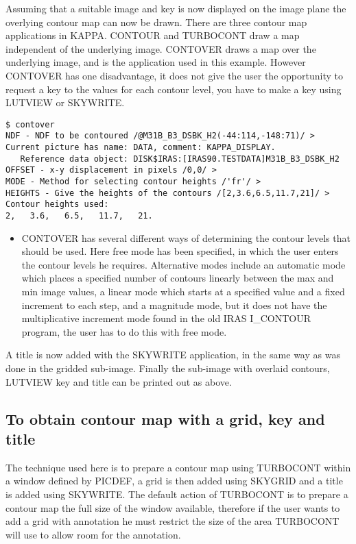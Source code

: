 Assuming that a suitable image and key is now displayed on the image plane
the overlying contour map can now be drawn. There are three contour map
applications in KAPPA. CONTOUR and TURBOCONT draw a map independent of the
underlying image. CONTOVER draws a map over the underlying image, and is the
application used in this example. However CONTOVER has one
disadvantage, it does not give the user the opportunity to request a key to the
values for each contour level, you have to make a key using LUTVIEW or SKYWRITE.
\begin{small}
\begin{verbatim}
$ contover
NDF - NDF to be contoured /@M31B_B3_DSBK_H2(-44:114,-148:71)/ > 
Current picture has name: DATA, comment: KAPPA_DISPLAY.
   Reference data object: DISK$IRAS:[IRAS90.TESTDATA]M31B_B3_DSBK_H2
OFFSET - x-y displacement in pixels /0,0/ > 
MODE - Method for selecting contour heights /'fr'/ > 
HEIGHTS - Give the heights of the contours /[2,3.6,6.5,11.7,21]/ > 
Contour heights used:
2,   3.6,   6.5,   11.7,   21.
\end{verbatim}
\end{small}
\begin{itemize}
\item CONTOVER  has several different ways of determining the contour 
levels that should be used. Here free mode has been specified, in which the 
user enters the contour levels he requires. Alternative modes include an
automatic mode which places a specified number of contours linearly between the
max and min image values, a linear mode which starts at a specified value and
a fixed increment to each step, and a magnitude mode, but it does not have the
multiplicative increment mode found in the old IRAS I\_CONTOUR program, the user
has to do this with free mode.
\end{itemize}
A title is now added with the SKYWRITE application, in the same way as was done
in the gridded sub-image. Finally the sub-image with overlaid contours, LUTVIEW
key and title can be printed out as above.

\subsection{To obtain contour map with a grid, key and title}
\label{k:contour}
The technique used here is to prepare a contour map using TURBOCONT within a
window defined by PICDEF, a grid is then added using SKYGRID and a title is
added using SKYWRITE. The default action of TURBOCONT is to prepare a contour
map the full size of the window available, therefore if the user wants to add
a grid with annotation he must restrict the size of the area TURBOCONT will
use to allow room for the annotation.

